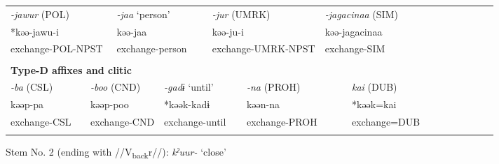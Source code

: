 \begin{tabularx}{\textwidth}{XXXXXXXXXXXXXXXXXXXX}
\multicolumn{3}{X}{{ \textit{{}-jawur} (POL)}} & \multicolumn{2}{X}{{ \textit{{}-jaa} ‘person’}} & \multicolumn{4}{X}{{ \textit{{}-jur} (UMRK)}} & \multicolumn{11}{X}{{ \textit{{}-jagacinaa} (SIM)}}\\
\multicolumn{3}{X}{{ *kəə-jawu-i}} & \multicolumn{2}{X}{{ kəə-jaa}} & \multicolumn{4}{X}{kəə-ju-i} & \multicolumn{11}{X}{{ kəə-jagacinaa}}\\
\multicolumn{3}{X}{exchange-POL-NPST} & \multicolumn{2}{X}{exchange-person} & \multicolumn{4}{X}{exchange-UMRK-NPST} & \multicolumn{11}{X}{exchange-SIM}\\
\multicolumn{20}{X}{}\\
\multicolumn{20}{X}{{\bfseries Type-D affixes and clitic}}\\
{ \textit{{}-ba} (CSL)} & \multicolumn{3}{X}{{ \textit{{}-boo} (CND)}} & \multicolumn{3}{X}{{ \textit{{}-gadɨ} ‘until’}} & \multicolumn{3}{X}{{ \textit{{}-na} (PROH)}} & \multicolumn{3}{X}{{ \textit{kai} (DUB)}} & \multicolumn{7}{X}{}\\
{ kəəp-pa} & \multicolumn{3}{X}{{ kəəp-poo}} & \multicolumn{3}{X}{{ *kəək-kadɨ}} & \multicolumn{3}{X}{{ kəən-na}} & \multicolumn{3}{X}{{ *kəək=kai}} & \multicolumn{7}{X}{}\\
exchange-CSL & \multicolumn{3}{X}{exchange-CND} & \multicolumn{3}{X}{exchange-until} & \multicolumn{3}{X}{exchange-PROH} & \multicolumn{3}{X}{exchange=DUB} & \multicolumn{7}{X}{}\\
\lspbottomrule
\end{tabularx}
Stem No. 2 (ending with //V\textsubscript{back}r//): \textit{kˀuur-} ‘close’

\tablefirsthead{}

